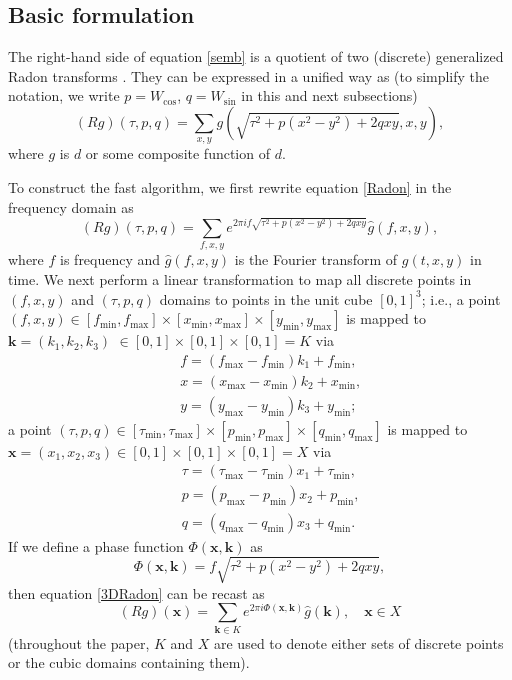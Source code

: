 \subsection{Basic formulation}

The right-hand side of equation \ref{semb} is a quotient of two (discrete) generalized Radon transforms \citep{Beylkin84}. They can be expressed in a unified way as (to simplify the notation, we write $p=W_{\cos}$, $q=W_{\sin}$ in this and next subsections)
\begin{equation} \label{Radon}
(Rg)(\tau,p,q)=\sum_{x,y}g(\sqrt{\tau^2+p(x^2-y^2)+2qxy},x,y),
\end{equation}
where $g$ is $d$ or some composite function of $d$. %

To construct the fast algorithm, we first rewrite equation \ref{Radon} in the frequency domain as
\begin{equation} \label{3DRadon}
(Rg)(\tau,p,q)=\sum_{f,x,y} e^{2\pi i f \sqrt{\tau^2+p(x^2-y^2)+2qxy}}\hat{g}(f,x,y),
\end{equation}
where $f$ is frequency and $\hat{g}(f,x,y)$ is the Fourier transform of $g(t,x,y)$ in time. We next perform a linear transformation to map all discrete points in $(f,x,y)$ and $(\tau,p,q)$ domains to points in the unit cube $[0,1]^3$; i.e., a point $(f,x,y)\in[f_\text{min},f_\text{max}]\times[x_\text{min},x_\text{max}]\times [y_\text{min},y_\text{max}]$ is mapped to $\mathbf{k}=(k_1,k_2,k_3)$ $\in[0,1]\times[0,1]\times[0,1]=K$ via
\begin{eqnarray*}
&&f=(f_\text{max}-f_\text{min})k_1+f_\text{min}, \\
&&x=(x_\text{max}-x_\text{min})k_2+x_\text{min}, \\
&&y=(y_\text{max}-y_\text{min})k_3+y_\text{min};
\end{eqnarray*}
a point $(\tau,p,q)\in[\tau_\text{min},\tau_\text{max}]\times[p_\text{min},p_\text{max}]\times[q_\text{min},q_\text{max}]$ is mapped to $\mathbf{x}=(x_1,x_2,x_3)\in[0,1]\times[0,1]\times[0,1]=X$ via
\begin{eqnarray*}
&&\tau=(\tau_\text{max}-\tau_\text{min})x_1+\tau_\text{min}, \\
&&p=(p_\text{max}-p_\text{min})x_2+p_\text{min}, \\
&&q=(q_\text{max}-q_\text{min})x_3+q_\text{min}.
\end{eqnarray*}
If we define a phase function $\Phi(\mathbf{x},\mathbf{k})$ as
\begin{equation}
\Phi(\mathbf{x},\mathbf{k})= f \sqrt{\tau^2+p(x^2-y^2)+2qxy},
\end{equation}
then equation \ref{3DRadon} can be recast as
\begin{equation}  \label{OIO}
(Rg)(\mathbf{x})=\sum_{\mathbf{k}\in K}  e^{ 2\pi i
\Phi(\mathbf{x},\mathbf{k})}\hat{g}(\mathbf{k}), \quad \mathbf{x}\in X
\end{equation}
(throughout the paper, $K$ and $X$ are used to denote either sets of discrete points or the cubic
domains containing them).

